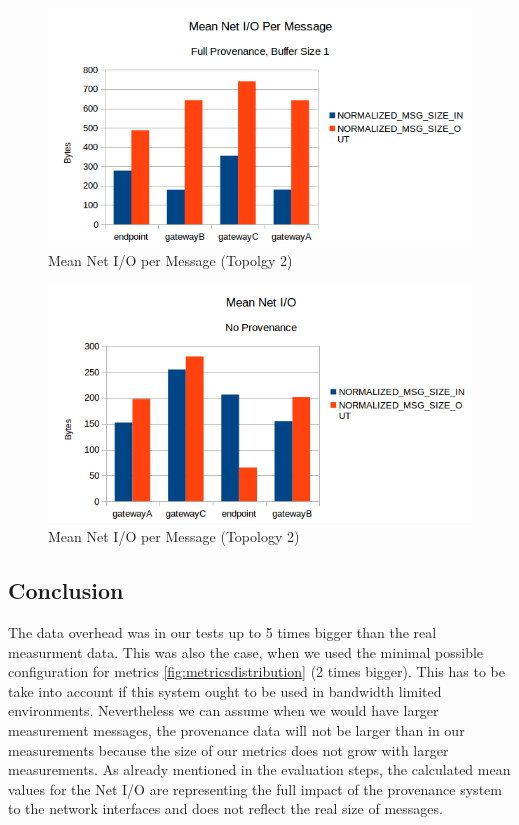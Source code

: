 \begin{figure}[H]
	\center
	\includegraphics[width=\textwidth]{figures/overheaddiagram5.png}
	\caption{Mean Net I/O per Message (Topolgy 2)}
	\label{fig:overhrad5}
\end{figure}

\begin{figure}[H]
	\center
	\includegraphics[width=\textwidth]{figures/overheaddiagram6.png}
	\caption{Mean Net I/O per Message (Topology 2)}
	\label{fig:overhead6}
\end{figure}

\subsection{Conclusion}
The data overhead was in our tests up to 5 times bigger than the real measurment data. This was also the case, when we used the minimal possible configuration for metrics \ref{fig:metricsdistribution} (2 times bigger).
This has to be take into account if this system ought to be used in bandwidth limited environments.
Nevertheless we can assume when we would have larger measurement messages, the provenance data will not be larger than in our measurements because the size of our metrics does not grow with larger measurements.
As already mentioned in the evaluation steps, the calculated mean values for the Net I/O are representing the full impact of the provenance system to the network interfaces and does not reflect the real size of messages.
